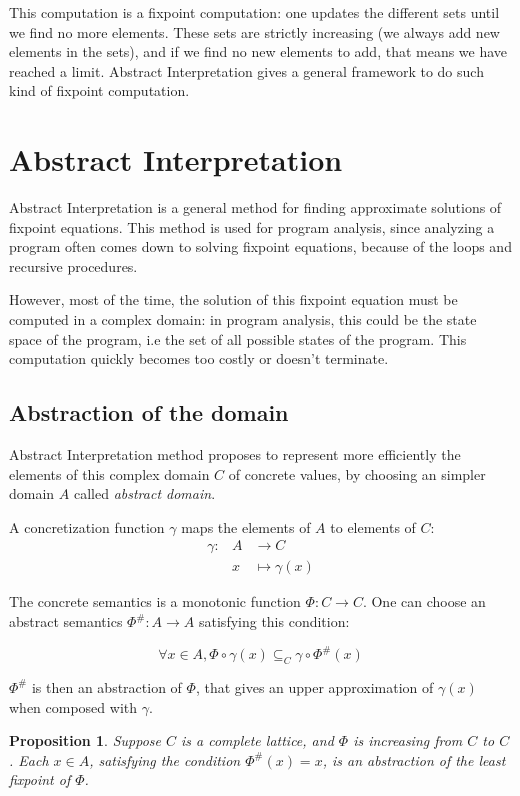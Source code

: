 \documentclass[a4paper,english,titlepage,11pt]{report}
\newtheorem{proposition}[theorem]{Proposition}
\begin{document}
This computation is a fixpoint computation: one updates the different sets until
we find no more elements. These sets are strictly increasing (we always add new
elements in the sets), and if we find no new elements to add, that means we have
reached a limit. Abstract Interpretation gives a general framework to do such
kind of fixpoint computation.


\section{Abstract Interpretation}

Abstract Interpretation \cite{CC77,CousotCousot92-1} is a general method for
finding approximate solutions of
fixpoint equations. This method is used for program analysis, since analyzing a
program often comes down to solving fixpoint equations, because of the loops and
recursive procedures.

However, most of the time, the solution of this fixpoint equation must be
computed in a complex domain: in program analysis, this could be the state space
of the program, i.e the set of all possible states of the program. This
computation quickly becomes too costly or doesn't terminate.

\subsection{Abstraction of the domain}

Abstract Interpretation method proposes to represent more efficiently the
elements of this complex domain $C$ of concrete values,
by choosing an simpler domain  $A$ called \emph{abstract domain}. 

A concretization function $\gamma$ maps the elements of $A$ to elements of $C$:
\begin{eqnarray*}
\gamma: & A &\longrightarrow C \\
		& x &\longmapsto \gamma(x)
\end{eqnarray*}

The concrete semantics is a monotonic function $\Phi: C \rightarrow C$.
One can choose an abstract semantics $\Phi^\#: A \rightarrow A$ satisfying this
condition:

$$\forall x \in A, \Phi \circ \gamma (x) \subseteq_C \gamma \circ \Phi^\#(x)$$

$\Phi^\#$ is then an abstraction of $\Phi$, that gives an upper
approximation of $\gamma(x)$ when composed with $\gamma$. 

\begin{proposition}
Suppose $C$ is a complete lattice, and $\Phi$ is increasing from $C$ to $C$.
Each $x \in A$, satisfying the condition $\Phi^\#(x) = x$, is an abstraction of
the least fixpoint of $\Phi$.
\end{proposition}
\end{document}
